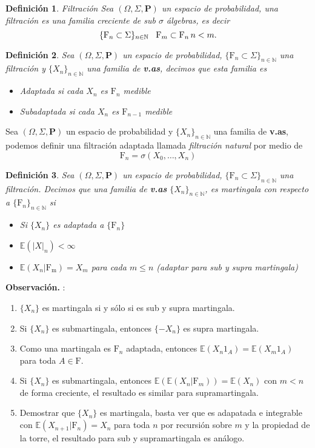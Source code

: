 \documentclass[letterpaper]{article}
\newtheorem{def.}{Definici\'on}[section]
\newcommand{\nat}{\ensuremath{ \mathbb N }}
\newcommand{\prob}{\textbf{P}}
\newcommand{\esp}{\mathbb E}
\newcommand{\obs}{{\newline \noindent \sc \textbf{Observación. }}}
\newcommand{\om}{\ensuremath{\Omega}}
\newcommand{\sig}{\ensuremath{\Sigma}}
\begin{document}
\begin{def.}{Filtración}
Sea \((\om,\sig,\prob)\) un espacio de probabilidad, una filtración es una familia creciente de sub \(\sigma\) álgebras, es decir
\[
    \{\mathrm{F}_n\subset\sig\}_{n\in\nat}\hspace{0.3cm}\mathrm{F}_m\subset\mathrm{F}_n\,n<m.
\]
\end{def.}
\begin{def.}
Sea \((\om,\sig,\prob)\) un espacio de probabilidad, \(\{\mathrm{F}_n\subset\sig\}_{n\in\nat}\) una filtración y \(\{X_n\}_{n\in\nat}\) una familia de \textbf{v.as}, decimos que esta familia es
\begin{itemize}
\item Adaptada si cada \(X_n\) es \(\mathrm{F}_n\) medible
\item Subadaptada si cada \(X_n\) es \(\mathrm{F}_{n-1}\) medible
\end{itemize}
\end{def.}
\noindent \obs Sea \((\om,\sig,\prob)\) un espacio de probabilidad y \(\{X_n\}_{n\in\nat}\) una familia de \textbf{v.as}, podemos definir una filtración adaptada llamada \emph{filtración natural} por medio de
\[
    \mathrm{F}_n=\sigma(X_0,\dots,X_n)
\]
\begin{def.}
Sea \((\om,\sig,\prob)\) un espacio de probabilidad, \(\{\mathrm{F}_n\subset\sig\}_{n\in\nat}\) una filtración. Decimos que una familia de \textbf{v.as} \(\{X_n\}_{n\in\nat}\), es martingala con respecto a \(\{\mathrm{F}_n\}_{n\in\nat}\) si
\begin{itemize}
\item Si \(\{X_n\}\) es adaptada a \(\{\mathrm{F}_n\}\)
\item \(\esp(|X|_{n})<\infty\)
\item \(\esp(X_{n}|\mathrm{F_m})=X_m\) para cada \(m\leq n\) (adaptar para sub y supra martingala)
\end{itemize}
\end{def.}
\obs:
\begin{enumerate}
\item \(\{X_n\}\) es martingala si y sólo si es sub y supra martingala.
\item Si \(\{X_n\}\) es submartingala, entonces \(\{-X_n\}\) es supra martingala.
\item Como una martingala es \(\mathrm{F}_n\) adaptada, entonces \(\esp(X_n1_A)=\esp(X_m1_A)\) para toda \(A\in\mathrm{F}\).
\item Si \(\{X_n\}\) es submartingala, entonces \(\esp(\esp(X_n|\mathrm{F}_m))=\esp(X_n)\) con \(m<n\) de forma creciente, el resultado es similar para supramartingala.
\item Demostrar que \(\{X_n\}\) es martingala, basta ver que es adapatada e integrable con \(\esp(X_{n+1}|\mathrm{F}_n)=X_n\) para toda \(n\) por recursión sobre \(m\) y la propiedad de la torre, el resultado para sub y supramartingala es análogo.
\end{enumerate}
\end{document}
